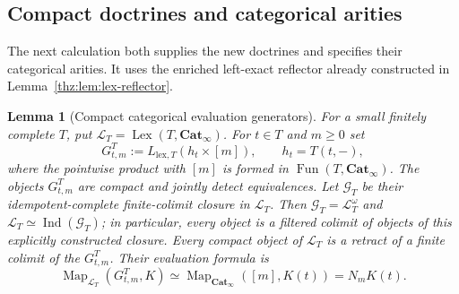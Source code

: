 \documentclass[oneside]{article}
\theoremstyle{plain}
\newtheorem{lemma}[theorem]{Lemma}
\theoremstyle{definition}
\theoremstyle{remark}
\newcommand{\Cat}{\mathbf{Cat}_{\infty}}
\newcommand{\Fun}{\operatorname{Fun}}
\newcommand{\Ind}{\operatorname{Ind}}
\newcommand{\Lex}{\operatorname{Lex}}
\newcommand{\Map}{\operatorname{Map}}
\begin{document}
\subsection{Compact doctrines and categorical arities}
\label{subsec:stratified-compact-doctrines}

The next calculation both supplies the new doctrines and specifies their
categorical arities.  It uses the enriched left-exact reflector already
constructed in Lemma~\ref{thz:lem:lex-reflector}.

\begin{lemma}[Compact categorical evaluation generators]
\label{lem:stratified-compact-generators}
For a small finitely complete $T$, put $\mathcal L_T=\Lex(T,\Cat)$.
For $t\in T$ and $m\geq0$ set
\[
 G^T_{t,m}:=L_{\mathrm{lex},T}(h_t\times[m]),
 \qquad h_t=T(t,-),
\]
where the pointwise product with $[m]$ is formed in
$\Fun(T,\Cat)$.  The objects $G^T_{t,m}$ are compact and jointly detect equivalences.
Let $\mathcal G_T$ be their idempotent-complete finite-colimit closure
in $\mathcal L_T$. Then $\mathcal G_T=\mathcal L_T^\omega$ and
$\mathcal L_T\simeq\Ind(\mathcal G_T)$; in particular, every object
is a filtered colimit of objects of this explicitly constructed closure.
Every compact object of $\mathcal L_T$ is a retract of a finite colimit
of the $G^T_{t,m}$.  Their evaluation formula is
\begin{equation}\label{eq:stratified-compact-evaluation}
 \Map_{\mathcal L_T}(G^T_{t,m},K)
 \simeq\Map_{\Cat}([m],K(t))=N_mK(t).
\end{equation}
\end{lemma}
\end{document}
